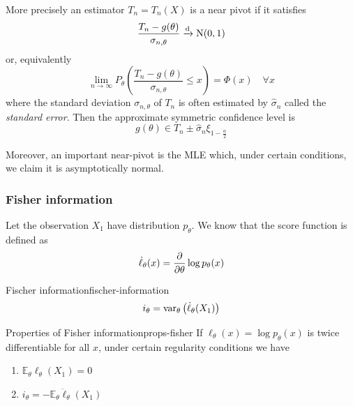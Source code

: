 \documentclass[12pt]{extarticle}
\renewcommand{\var}{{\operatorfont var}}
\newcommand{\E}{\mathds{E}}
\newcommand{\Normal}{{\operatorfont N}}
\newcommand{\convdist}{\xrightarrow{\operatorfont d}}
\begin{document}
More precisely an estimator $T_n = T_n(X)$ is a near pivot if it satisfies
\begin{equation}
    \frac{T_n - g(\theta)}{\sigma_{n, \theta}} \convdist \Normal(0,1)
\end{equation}
or, equivalently
\begin{equation}
    \lim_{n \to \infty} P_\theta \left( \frac{T_n - g(\theta)}{\sigma_{n, \theta}} \leq x \right) = \Phi(x) \quad \forall x
\end{equation}
where the standard deviation $\sigma_{n, \theta}$ of $T_n$ is often estimated by $\hat \sigma_n$ called the \emph{standard error}.
Then the approximate symmetric confidence level is
\begin{equation}
    g(\theta) \in T_n \pm \hat \sigma_n \xi_{1-\frac{\alpha}{2}}
\end{equation}

Moreover, an important near-pivot is the MLE which, under certain conditions, we claim it is asymptotically normal.

\subsubsection{Fisher information}

Let the observation $X_1$ have distribution $p_\theta$.
We know that the score function is defined as
\begin{equation}
    \dot \ell_\theta (x) = \pdv{}{\theta} \log p_\theta(x)
\end{equation}

\begin{definition}{Fischer information}{fischer-information}
    \begin{equation}
        i_\theta = \var_\theta \left(\dot \ell_\theta (X_1)\right)
    \end{equation}
\end{definition}

\begin{proposition}{Properties of Fisher information}{props-fisher}
    If $\ell_\theta(x) = \log p_\theta(x)$ is twice differentiable for all $x$, under certain regularity conditions we have
    \begin{enumerate}[label=\roman*.]
        \item $\E_\theta \ell_\theta (X_1) = 0$
        \item $i_\theta = -\E_\theta \ddot\ell_\theta(X_1)$
    \end{enumerate}
\end{proposition}
\end{document}

